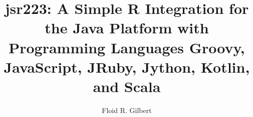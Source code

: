\documentclass[]{statthesisMEMOIR}
\title{jsr223: A Simple R Integration for the Java Platform with Programming Languages Groovy, JavaScript, JRuby, Jython, Kotlin, and Scala}
\author{Floid R. Gilbert}
\begin{document}






\nocite{*}
	

\end{document}
